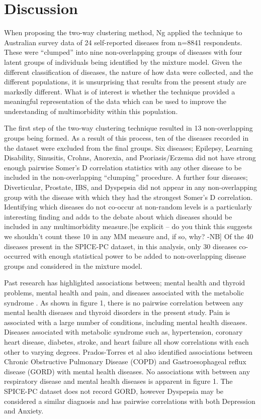 \documentclass[12pt,]{report}
\begin{document}
\FloatBarrier

\section{Discussion}\label{sec:clust-discussion}

When proposing the two-way clustering method, Ng \citeyearpar{RN72}
applied the technique to Australian survey data of 24 self-reported
diseases from n=8841 respondents. These were ``clumped'' into nine
non-overlapping groups of diseases with four latent groups of
individuals being identified by the mixture model. Given the different
classification of diseases, the nature of how data were collected, and
the different populations, it is unsurprising that results from the
present study are markedly different. What is of interest is whether the
technique provided a meaningful representation of the data which can be
used to improve the understanding of multimorbidity within this
population.

The first step of the two-way clustering technique resulted in 13
non-overlapping groups being formed. As a result of this process, ten of
the diseases recorded in the dataset were excluded from the final
groups. Six diseases; Epilepsy, Learning Disability, Sinusitis, Crohns,
Anorexia, and Psoriasis/Eczema did not have strong enough pairwise
Somer's D correlation statistics with any other disease to be included
in the non-overlapping ``clumping'' procedure. A further four diseases;
Diverticular, Prostate, IBS, and Dyspepsia did not appear in any
non-overlapping group with the disease with which they had the strongest
Somer's D correlation. Identifying which diseases do not co-occur at
non-random levels is a particularly interesting finding and adds to the
debate about which diseases should be included in any multimorbidity
measure.{[}be explicit -- do you think this suggests we shouldn't count
these 10 in any MM measure and, if so, why? -NB{]} Of the 40 diseases
present in the SPICE-PC dataset, in this analysis, only 30 diseases
co-occurred with enough statistical power to be added to non-overlapping
disease groups and considered in the mixture model.

Past research has highlighted associations between; mental health and
thyroid problems, mental health and pain, and diseases associated with
the metabolic syndrome \citep{RN98}. As shown in figure 1, there is no
pairwise correlation between any mental health diseases and thyroid
disorders in the present study. Pain is associated with a large number
of conditions, including mental health diseases. Diseases associated
with metabolic syndrome such as, hypertension, coronary heart disease,
diabetes, stroke, and heart failure all show correlations with each
other to varying degrees. Prados-Torres et al \citeyearpar{RN98} also
identified associations between Chronic Obstructive Pulmonary Disease
(COPD) and Gastroesophageal reflux disease (GORD) with mental health
diseases. No associations with between any respiratory disease and
mental health diseases is apparent in figure 1. The SPICE-PC dataset
does not record GORD, however Dyspepsia may be considered a similar
diagnosis and has pairwise correlations with both Depression and
Anxiety.
\end{document}
